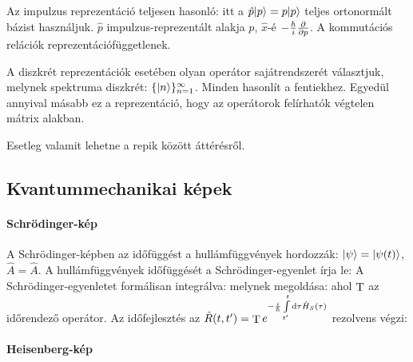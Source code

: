   Az impulzus reprezentáció teljesen hasonló: itt a $\hat{p}\lvert p\rangle=p\lvert p\rangle$ teljes ortonormált bázist használjuk. $\hat{p}$ impulzus-reprezentált alakja $p$, $\hat{x}$-é $-\frac{\hbar}{i}\frac{\partial }{\partial p}$. A kommutációs relációk reprezentációfüggetlenek. 
   
   A diszkrét reprezentációk esetében olyan operátor sajátrendszerét választjuk, melynek spektruma diszkrét: $\{\lvert n\rangle\}_{n=1}^{\infty}$. Minden hasonlít a fentiekhez. Egyedül annyival másabb ez a reprezentáció, hogy az operátorok felírhatók végtelen mátrix alakban. 
   
   {\color{red} Esetleg valamit lehetne a repik között áttérésről.}
   
  \subsection{Kvantummechanikai képek}
   
   \paragraph{Schrödinger-kép}
    
    A Schrödinger-képben az időfüggést a hullámfüggvények hordozzák: $\lvert\psi\rangle=\lvert\psi(t)\rangle$, $\hat{A}=\hat{A}$. A hullámfüggvények időfüggését a Schrödinger-egyenlet írja le:
    A Schrödinger-egyenletet formálisan integrálva:
    melynek megoldása:
    ahol $\mathop{\mathrm{T}}\nolimits$ az időrendező operátor. Az időfejlesztés az $\hat{R}(t,t')=\mathop{\mathrm{T}}\nolimits e^{-\frac{i}{\hbar}\int\limits_{t'}^{t}\mathrm{d} \tau \hat{H}_S(\tau)}$ rezolvens végzi:
    
   \paragraph{Heisenberg-kép}
   
